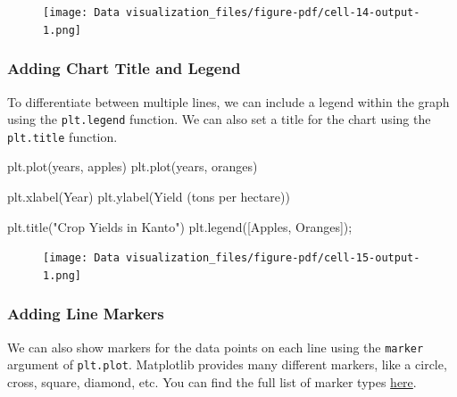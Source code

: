 \documentclass[
  letterpaper,
  DIV=11,
  numbers=noendperiod]{scrreprt}
\newenvironment{Shaded}{\begin{snugshade}}{\end{snugshade}}
\newcommand{\NormalTok}[1]{\textcolor[rgb]{0.00,0.23,0.31}{#1}}
\newcommand{\OperatorTok}[1]{\textcolor[rgb]{0.37,0.37,0.37}{#1}}
\newcommand{\StringTok}[1]{\textcolor[rgb]{0.13,0.47,0.30}{#1}}
\begin{document}
\begin{figure}[H]

{\centering \texttt{[image: Data visualization\_files/figure-pdf/cell-14-output-1.png]}

}

\end{figure}

\hypertarget{adding-chart-title-and-legend}{%
\subsubsection{Adding Chart Title and
Legend}\label{adding-chart-title-and-legend}}

To differentiate between multiple lines, we can include a legend within
the graph using the \texttt{plt.legend} function. We can also set a
title for the chart using the \texttt{plt.title} function.

\begin{Shaded}
\begin{Highlighting}[]
\NormalTok{plt.plot(years, apples)}
\NormalTok{plt.plot(years, oranges)}

\NormalTok{plt.xlabel(}\StringTok{\textquotesingle{}Year\textquotesingle{}}\NormalTok{)}
\NormalTok{plt.ylabel(}\StringTok{\textquotesingle{}Yield (tons per hectare)\textquotesingle{}}\NormalTok{)}

\NormalTok{plt.title(}\StringTok{"Crop Yields in Kanto"}\NormalTok{)}
\NormalTok{plt.legend([}\StringTok{\textquotesingle{}Apples\textquotesingle{}}\NormalTok{, }\StringTok{\textquotesingle{}Oranges\textquotesingle{}}\NormalTok{])}\OperatorTok{;}
\end{Highlighting}
\end{Shaded}

\begin{figure}[H]

{\centering \texttt{[image: Data visualization\_files/figure-pdf/cell-15-output-1.png]}

}

\end{figure}

\hypertarget{adding-line-markers}{%
\subsubsection{Adding Line Markers}\label{adding-line-markers}}

We can also show markers for the data points on each line using the
\texttt{marker} argument of \texttt{plt.plot}. Matplotlib provides many
different markers, like a circle, cross, square, diamond, etc. You can
find the full list of marker types
\href{https://matplotlib.org/3.1.1/api/markers_api.html}{here}.
\end{document}
